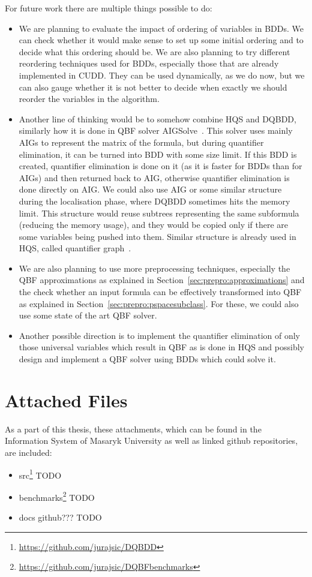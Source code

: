 \documentclass[
  digital, %
  color,
  twoside, %
  table,   %
  nolof,     %
  nolot,     %
]{fithesis3}
\theoremstyle{definition}
\theoremstyle{remark}
\begin{document}
For future work there are multiple things possible to do:
\begin{itemize}
  \item We are planning to evaluate the impact of ordering of variables in BDDs. We can check whether it would make sense to set up some initial ordering and to decide what this ordering should be. We are also planning to try different reordering techniques used for BDDs, especially those that are already implemented in CUDD. They can be used dynamically, as we do now, but we can also gauge whether it is not better to decide when exactly we should reorder the variables in the algorithm.
  \item Another line of thinking would be to somehow combine HQS and DQBDD, similarly how it is done in QBF solver AIGSol\-ve~\cite{AIGSolve}. This solver uses mainly AIGs to represent the matrix of the formula, but during quantifier elimination, it can be turned into BDD with some size limit. If this BDD is created, quantifier elimination is done on it (as it is faster for BDDs than for AIGs) and then returned back to AIG, otherwise quantifier elimination is done directly on AIG. We could also use AIG or some similar structure during the localisation phase, where DQBDD sometimes hits the memory limit. This structure would reuse subtrees representing the same subformula (reducing the memory usage), and they would be copied only if there are some variables being pushed into them. Similar structure is already used in HQS, called quantifier graph~\cite{HQSquantifierLocalisation}.
  \item We are also planning to use more preprocessing techniques, especially the QBF approximations as explained in Section~\ref{sec:prepro:approximations} and the check whether an input formula can be effectively transformed into QBF as explained in Section~\ref{sec:prepro:pspacesubclass}. For these, we could also use some state of the art QBF solver.
  \item Another possible direction is to implement the quantifier elimination of only those universal variables which result in QBF as is done in HQS and possibly design and implement a QBF solver using BDDs which could solve it.
\end{itemize}

\begingroup
\setlength{\emergencystretch}{8em}
\printbibliography[heading=bibintoc]
\endgroup


\appendix %

\chapter{Attached Files}
\label{appendix:attachments}
As a part of this thesis, these attachments, which can be found in the Information System of Masaryk University as well as linked github repositories, are included:
\begin{itemize}
    \item src\footnote{\url{https://github.com/jurajsic/DQBDD}} TODO
    \item benchmarks\footnote{\url{https://github.com/jurajsic/DQBFbenchmarks}} TODO
    \item docs github??? TODO
\end{itemize}
\end{document}
